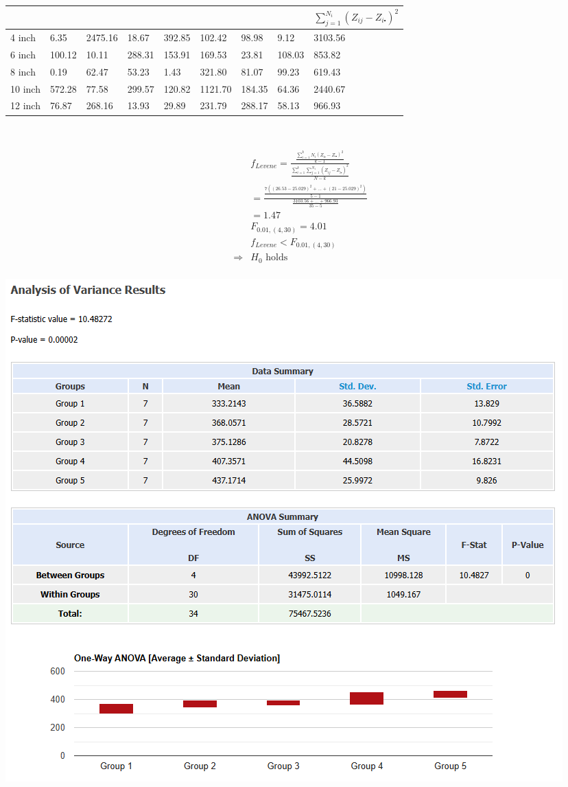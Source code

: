 \documentclass{article}
\begin{document}
\begin{table}[H]
    \begin{tabular}{|l|l|l|l|l|l|l|l|l|}
    \hline
            &       &       &       &       &       &       &       & $\sum_{j=1}^{N_i}(Z_{ij}-Z_{i\centerdot})^2$ \\ \hline
    4 inch  & 6.35 & 2475.16 & 18.67 & 392.85 & 102.42 & 98.98 & 9.12 & 3103.56                    \\ \hline
    6 inch  & 100.12& 10.11 & 288.31 & 153.91 & 169.53 & 23.81 & 108.03 & 853.82                    \\ \hline
    8 inch  & 0.19 & 62.47 & 53.23 & 1.43 & 321.80& 81.07 & 99.23 & 619.43                    \\ \hline
    10 inch & 572.28 & 77.58 & 299.57 & 120.82 & 1121.70 & 184.35 & 64.36 & 2440.67                     \\ \hline
    12 inch & 76.87 & 268.16 & 13.93 & 29.89 & 231.79 & 288.17 & 58.13 & 966.93                     \\ \hline
    \end{tabular}
\end{table}

~

\begin{align*}
    &f_{Levene}=\frac{\frac{\sum_{i=1}^{k}N_i(Z_{i\centerdot }-Z_{\centerdot \centerdot })^2}{k-1}}{\frac{\sum_{i=1}^{k}\sum_{j=1}^{N_1}(Z_{ij }-Z_{i \centerdot })^2}{N-k}}\\
    &=\frac{\frac{7((26.53-25.029)^2+...+(21-25.029)^2)}{5-1}}{\frac{3103.56+...+966.93}{35-5}}\\
    &=1.47\\
    &F_{0.01,(4,30)}=4.01\\
    &f_{Levene}<F_{0.01,(4,30)}\\
    \Rightarrow&H_0\text{ holds}\\
\end{align*}

\includegraphics[scale=0.5]{1b.png}
\end{document}
